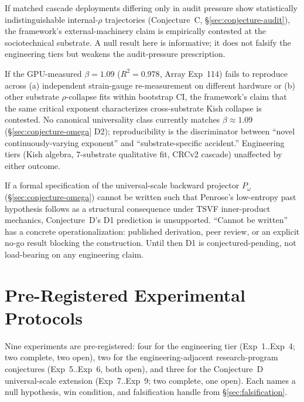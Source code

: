 \documentclass[11pt,a4paper]{article}
\begin{document}
\begin{description}[leftmargin=2em,style=nextline]
  \item[F-10: Audit-pressure prediction failure.] If matched cascade deployments differing only in audit pressure show statistically indistinguishable internal-$\rho$ trajectories (Conjecture~C, \S\ref{sec:conjecture-audit}), the framework's external-machinery claim is empirically contested at the sociotechnical substrate. A null result here is informative; it does not falsify the engineering tiers but weakens the audit-pressure prescription.
  \item[F-11: $\beta$ universality reproducibility failure.] If the GPU-measured $\beta = 1.09$ ($R^2 = 0.978$, Array Exp~114) fails to reproduce across (a) independent strain-gauge re-measurement on different hardware or (b) other substrate $\rho$-collapse fits within bootstrap CI, the framework's claim that the same critical exponent characterizes cross-substrate Kish collapse is contested. No canonical universality class currently matches $\beta \approx 1.09$ (\S\ref{sec:conjecture-omega} D2); reproducibility is the discriminator between ``novel continuously-varying exponent'' and ``substrate-specific accident.'' Engineering tiers (Kish algebra, 7-substrate qualitative fit, CRCv2 cascade) unaffected by either outcome.
  \item[F-12: $P_\omega$ derivation failure.] If a formal specification of the universal-scale backward projector $P_\omega$ (\S\ref{sec:conjecture-omega}) cannot be written such that Penrose's low-entropy past hypothesis follows as a structural consequence under TSVF inner-product mechanics, Conjecture~D's D1 prediction is unsupported. ``Cannot be written'' has a concrete operationalization: published derivation, peer review, or an explicit no-go result blocking the construction. Until then D1 is conjectured-pending, not load-bearing on any engineering claim.
\end{description}

\section{Pre-Registered Experimental Protocols}
\label{sec:experiments}

Nine experiments are pre-registered: four for the engineering tier (Exp~1..Exp~4; two complete, two open), two for the engineering-adjacent research-program conjectures (Exp~5..Exp~6, both open), and three for the Conjecture~D universal-scale extension (Exp~7..Exp~9; two complete, one open). Each names a null hypothesis, win condition, and falsification handle from \S\ref{sec:falsification}.
\end{document}
